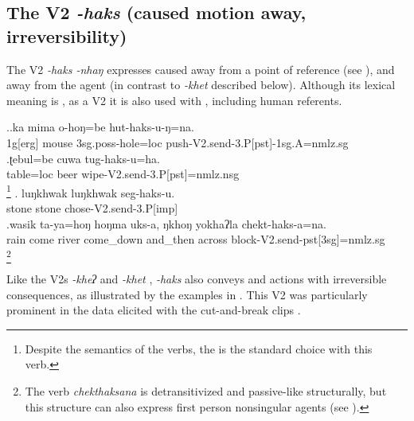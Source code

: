 \subsection{The V2 \emph{-haks} (caused motion away, irreversibility)}\label{V2-send}%

The V2 \emph{-haks \ti -nhaŋ}  expresses caused  away from a point of reference (see \Next),  and away from the agent (in contrast to \emph{-khet}  described below).  Although its lexical meaning is , as a V2 it is also used with , including human referents.


\ex.\ag.ka mima o-hoŋ=be hut-haks-u-ŋ=na.\\
{\sc 1g[erg]} mouse  {\sc 3sg.poss-}hole{\sc =loc} push{\sc -V2.send-3.P[pst]-1sg.A=nmlz.sg}\\
\newpage
\bg.ʈebul=be cuwa tug-haks-u=ha.\\
table{\sc =loc} beer wipe{\sc -V2.send-3.P[pst]=nmlz.nsg}\\
\footnote{Despite the  semantics of the verbs, the  is the standard  choice with this verb.}
\bg. luŋkhwak luŋkhwak seg-haks-u.\\
stone stone chose{\sc -V2.send-3.P[imp]}\\
\bg.wasik ta-ya=hoŋ hoŋma uks-a, ŋkhoŋ yokhaʔla chekt-haks-a=na.\\
rain  come river come\_down and\_then across block{\sc -V2.send-pst[3sg]=nmlz.sg}\\
\footnote{The verb \emph{chekthaksana} is detransitivized and passive-like structurally, but this structure can also express first person nonsingular agents (see ).}


Like the V2s \emph{-kheʔ}  and \emph{-khet} , \emph{-haks}  also conveys  and actions with irreversible consequences, as illustrated by the examples in \Next. This V2 was  particularly prominent in the data elicited with the cut-and-break clips   \citep{Bohnemeyeretal2010_cut}.
\largerpage

